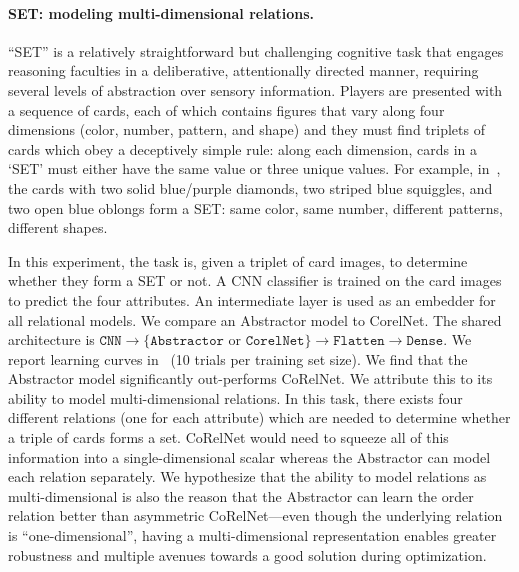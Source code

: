 \paragraph{SET: modeling multi-dimensional relations.}
``SET'' is a relatively straightforward but challenging cognitive task that engages reasoning faculties in a deliberative, attentionally directed manner, requiring several levels of abstraction over sensory information. Players are presented with a sequence of cards, each of which contains figures that vary along four dimensions (color, number, pattern, and shape) and they must find triplets of cards which obey a deceptively simple rule: along each dimension, cards in a `SET' must either have the same value or three unique values. For example, in~, the cards with two solid blue/purple diamonds, two striped blue squiggles, and two open blue oblongs form a SET: same color, same number, different patterns, different shapes.

In this experiment, the task is, given a triplet of card images, to determine whether they form a SET or not. A CNN classifier is trained on the card images to predict the four attributes. An intermediate layer is used as an embedder for all relational models. We compare an Abstractor model to CorelNet. The shared architecture is $\texttt{CNN} \to \{\texttt{Abstractor} \text{ or } \texttt{CorelNet}\} \to \texttt{Flatten} \to \texttt{Dense}$. We report learning curves in~ (10 trials per training set size). We find that the Abstractor model significantly out-performs CoRelNet. We attribute this to its ability to model multi-dimensional relations. In this task, there exists four different relations (one for each attribute) which are needed to determine whether a triple of cards forms a set. CoRelNet would need to squeeze all of this information into a single-dimensional scalar whereas the Abstractor can model each relation separately. We hypothesize that the ability to model relations as multi-dimensional is also the reason that the Abstractor can learn the order relation better than asymmetric CoRelNet---even though the underlying relation is ``one-dimensional'', having a multi-dimensional representation enables greater robustness and multiple avenues towards a good solution during optimization.

